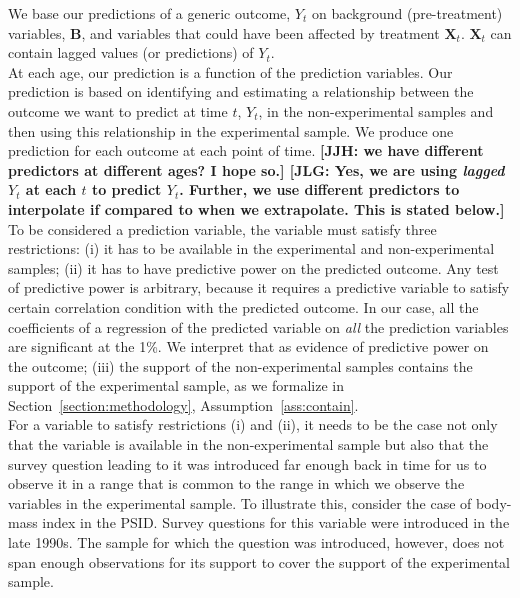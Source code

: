 \noindent We base our predictions of a generic outcome, $Y_{t}$ on background (pre-treatment) variables, $\bm{B}$, and variables that could have been affected by treatment $\bm{X}_{t}$. $\bm{X}_{t}$ can contain lagged values (or predictions) of $Y_{t}$.\\

\noindent At each age, our prediction is a function of the prediction variables. Our prediction is based on identifying and estimating a relationship between the outcome we want to predict at time $t$, $Y_{t}$, in the non-experimental samples and then using this relationship in the experimental sample. We produce one prediction for each outcome at each point of time. \textbf{[JJH: we have different predictors at different ages? I hope so.] [JLG: Yes, we are using \textit{lagged} $Y_{t}$ at each $t$ to predict $Y_{t}$. Further, we use different predictors to interpolate if compared to when we extrapolate. This is stated below.]}\\

\noindent To be considered a prediction variable, the variable must satisfy three restrictions: (i) it has to be available in the experimental and non-experimental samples; (ii) it has to have predictive power on the predicted outcome. Any test of predictive power is arbitrary, because it requires a predictive variable to satisfy certain correlation condition with the predicted outcome. In our case, all the coefficients of a regression of the predicted variable on \textit{all} the prediction variables are significant at the 1\%. We interpret that as evidence of predictive power on the outcome; (iii) the support of the non-experimental samples contains the support of the experimental sample, as we formalize in  Section~\ref{section:methodology},  Assumption~\ref{ass:contain}.\\

\noindent For a variable to satisfy restrictions (i) and (ii), it needs to be the case not only that the variable is available in the non-experimental sample but also that the survey question leading to it was introduced far enough back in time for us to observe it in a range that is common to the range in which we observe the variables in the experimental sample. To illustrate this, consider the case of body-mass index in the PSID. Survey questions for this variable were introduced in the late 1990s. The sample for which the question was introduced, however, does not span enough observations for its support to cover the support of the experimental sample.\\

